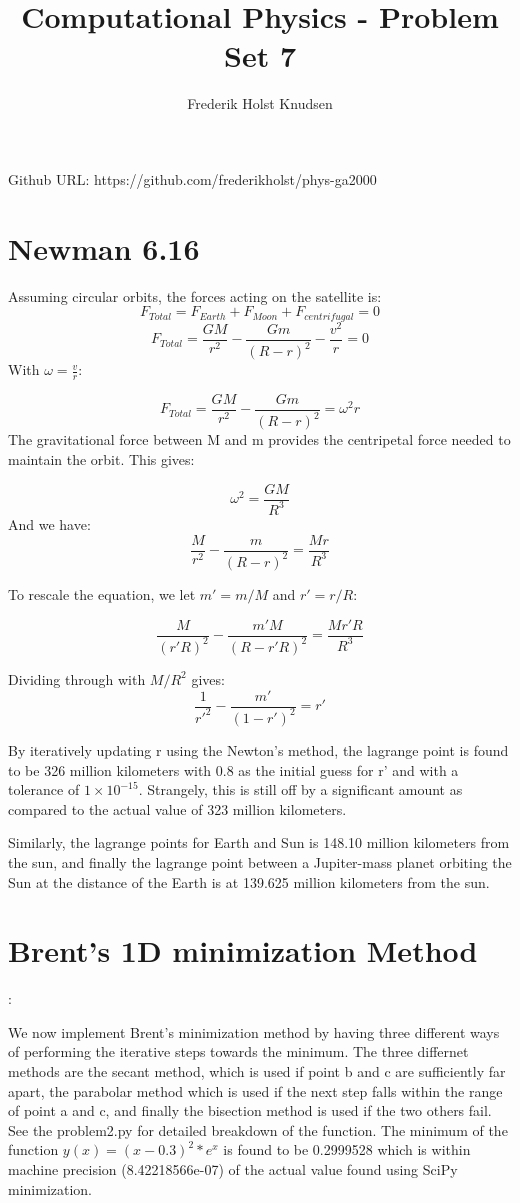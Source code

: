 \documentclass[11pt]{article}
\title{Computational Physics -  Problem Set 7}
\author{Frederik Holst Knudsen}
\begin{document}
\maketitle
Github URL: https://github.com/frederikholst/phys-ga2000
\section{Newman 6.16}
Assuming circular orbits, the forces acting on the satellite is:
$$F_{Total}=F_{Earth}+F_{Moon} + F_{centrifugal}=0$$
$$F_{Total}=\frac{GM}{r^2}-\frac{Gm}{(R-r)^2}-\frac{v^2}{r}=0$$
With $\omega =\frac{v}{r}$:

$$F_{Total}=\frac{GM}{r^2}-\frac{Gm}{(R-r)^2}=\omega^2r $$
The gravitational force between M and m provides the centripetal force needed to maintain the orbit. This gives:

$$\omega^2=\frac{GM}{R^3}$$
And we have:
$$\frac{M}{r^2}-\frac{m}{(R-r)^2}=\frac{Mr}{R^3} $$

To rescale the equation, we let $m'=m/M$ and $r'=r/R$:

$$\frac{M}{(r'R)^2}-\frac{m'M}{(R-r'R)^2}=\frac{Mr'R}{R^3} $$

Dividing through with $M/R^2$ gives:
$$\frac{1}{r'^2}-\frac{m'}{(1-r')^2}=r' $$

By iteratively updating r using the Newton's method, the lagrange point is found to be 326 million kilometers with 0.8 as the initial guess for r' and with a tolerance of $1\times 10^{-15}$. Strangely, this is still off by a significant amount as compared to the actual value of 323 million kilometers. 

Similarly, the lagrange points for Earth and Sun is 148.10 million kilometers from the sun, and finally the lagrange point between a Jupiter-mass planet orbiting the Sun at the distance of the Earth is at 139.625 million kilometers from the sun. 

\section{Brent's 1D minimization Method}:

We now implement Brent's minimization method by having three different ways of performing the iterative steps towards the minimum. The three differnet methods are the secant method, which is used if point b and c are sufficiently far apart, the parabolar method which is used if the next step falls within the range of point a and c, and finally the bisection method is used if the two others fail. See the problem2.py for detailed breakdown of the function. The minimum of the function $y(x)=(x-0.3)^2*e^{x}$ is found to be 0.2999528 which is within machine precision (8.42218566e-07) of the actual value found using SciPy minimization. 
\end{document}
